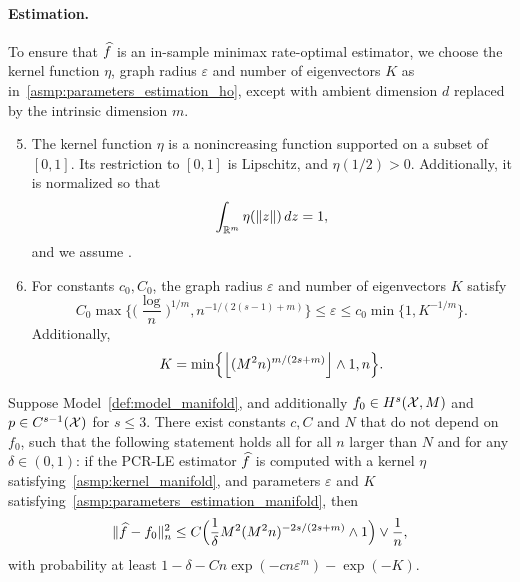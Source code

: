 \paragraph{Estimation.}
To ensure that $\widehat{f}$ is an in-sample minimax rate-optimal estimator, we choose the kernel function $\eta$, graph radius $\varepsilon$ and number of eigenvectors $K$ as in~\ref{asmp:parameters_estimation_ho}, except with ambient dimension $d$ replaced by the intrinsic dimension $m$.

\begin{enumerate}[label=(P\arabic*)]
	\setcounter{enumi}{4}
	\item 
	\label{asmp:kernel_manifold}
	The kernel function $\eta$ is a nonincreasing function supported on a subset of $[0,1]$. Its restriction to $[0,1]$ is Lipschitz, and $\eta(1/2) > 0$. Additionally, it is normalized so that
	\begin{equation*}
	\int_{\mathbb{R}^m} \eta(\|z\|) \,dz = 1,
	\end{equation*}
	and we assume .
	\item 
	\label{asmp:parameters_estimation_manifold}
	For constants $c_0,C_0$, the graph radius $\varepsilon$ and number of eigenvectors $K$ satisfy
	\begin{equation}
	\label{eqn:radius_estimation_manifold}
	C_0\max\biggl\{\biggl(\frac{\log}{n}\biggr)^{1/m}, n^{-1/(2(s - 1) + m)}\biggr\} \leq \varepsilon \leq c_0\min\{1, K^{-1/m}\}.
	\end{equation}
	Additionally,
	\begin{equation*}
	K = \min\Bigl\{\left\lfloor (M^2n)^{m/(2s + m)} \right\rfloor \wedge 1,n \Bigr\}.
	\end{equation*}
\end{enumerate}

\begin{theorem}
	\label{thm:laplacian_eigenmaps_estimation_manifold}
	Suppose Model~\ref{def:model_manifold}, and additionally $f_0 \in H^s(\mathcal{X},M)$ and $p \in C^{s - 1}(\mathcal{X})$ for $s \leq 3$. There exist constants $c,C$ and $N$ that do not depend on $f_0$, such that the following statement holds all for all $n$ larger than $N$ and for any $\delta \in (0,1)$: if the PCR-LE estimator $\widehat{f}$ is computed with a kernel $\eta$ satisfying~\ref{asmp:kernel_manifold}, and parameters $\varepsilon$ and $K$ satisfying~\ref{asmp:parameters_estimation_manifold}, then
	\begin{equation}
	\label{eqn:laplacian_eigenmaps_estimation_manifold}
	\|\widehat{f} - f_0\|_n^2 \leq C\Bigl(\frac{1}{\delta}M^2(M^2n)^{-2s/(2s + m)} \wedge 1\Bigr) \vee \frac{1}{n},
	\end{equation}
	with probability at least $1 - \delta - Cn\exp(-cn\varepsilon^m) - \exp(-K)$.
\end{theorem}

